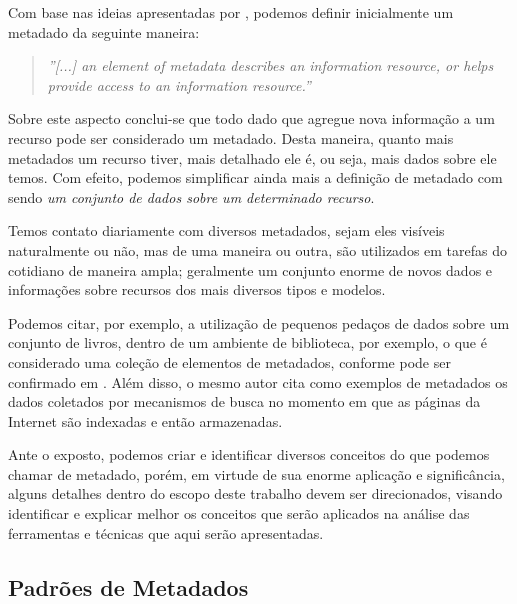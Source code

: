 \begin{textonovo}

Com base nas ideias apresentadas por \cite{meta-dados}, podemos definir inicialmente um metadado da seguinte maneira:

\begin{quote}
\textit{''[...] an element of metadata describes an information resource, or helps provide access to an information resource.''}
\end{quote}

Sobre este aspecto conclui-se que todo dado que agregue nova informação a um recurso pode ser considerado um metadado. Desta maneira, quanto mais metadados um recurso tiver, mais detalhado ele é, ou seja, mais dados sobre ele temos. Com efeito, podemos simplificar ainda mais a definição de metadado com sendo \textit{um conjunto de dados sobre um determinado recurso}.

Temos contato diariamente com diversos metadados, sejam eles visíveis naturalmente ou não, mas de uma maneira ou outra, são utilizados em tarefas do cotidiano de maneira ampla; geralmente um conjunto enorme de novos dados e informações sobre recursos dos mais diversos tipos e modelos.

Podemos citar, por exemplo, a utilização de pequenos pedaços de dados sobre um conjunto de livros, dentro de um ambiente de biblioteca, por exemplo, o que é considerado uma coleção de elementos de metadados, conforme pode ser confirmado em \cite{meta-dados}. Além disso, o mesmo autor cita como exemplos de metadados os dados coletados por mecanismos de busca no momento em que as páginas da Internet são indexadas e então armazenadas.

Ante o exposto, podemos criar e identificar diversos conceitos do que podemos chamar de metadado, porém, em virtude de sua enorme aplicação e significância, alguns detalhes dentro do escopo deste trabalho devem ser direcionados, visando identificar e explicar melhor os conceitos que serão aplicados na análise das ferramentas e técnicas que aqui serão apresentadas.

\end{textonovo}

\subsection{Padrões de Metadados}
\label{padroes-de-metadados}

